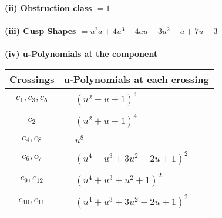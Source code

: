 \documentclass[1p]{elsarticle_modified}
\theoremstyle{definition}
\begin{document}
\flushleft \textbf{(ii) Obstruction class $= 1$}\\~\\
\flushleft \textbf{(iii) Cusp Shapes $= u^2 a+4 u^3-4 a u-3 u^2- a+7 u-3$}\\~\\
\newpage\renewcommand{\arraystretch}{1}
\flushleft \textbf{(iv) u-Polynomials at the component}\newline \\
\begin{tabular}{m{50pt}|m{274pt}}
Crossings & \hspace{64pt}u-Polynomials at each crossing \\
\hline $$\begin{aligned}c_{1},c_{3},c_{5}\end{aligned}$$&$\begin{aligned}
&(u^2- u+1)^4
\end{aligned}$\\
\hline $$\begin{aligned}c_{2}\end{aligned}$$&$\begin{aligned}
&(u^2+u+1)^4
\end{aligned}$\\
\hline $$\begin{aligned}c_{4},c_{8}\end{aligned}$$&$\begin{aligned}
&u^8
\end{aligned}$\\
\hline $$\begin{aligned}c_{6},c_{7}\end{aligned}$$&$\begin{aligned}
&(u^4- u^3+3 u^2-2 u+1)^2
\end{aligned}$\\
\hline $$\begin{aligned}c_{9},c_{12}\end{aligned}$$&$\begin{aligned}
&(u^4+u^3+u^2+1)^2
\end{aligned}$\\
\hline $$\begin{aligned}c_{10},c_{11}\end{aligned}$$&$\begin{aligned}
&(u^4+u^3+3 u^2+2 u+1)^2
\end{aligned}$\\
\hline
\end{tabular}\\~\\
\end{document}

